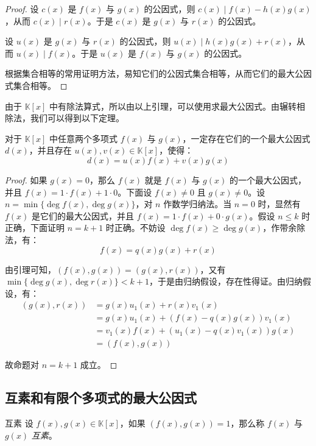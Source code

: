 \begin{proof}
	设 $c(x)$ 是 $f(x)$ 与 $g(x)$ 的公因式，则 $c(x) \mid f(x) - h(x) g(x)$，从而 $c(x) \mid r(x)$。于是 $c(x)$ 是 $g(x)$ 与 $r(x)$ 的公因式。

	设 $u(x)$ 是 $g(x)$ 与 $r(x)$ 的公因式，则 $u(x) \mid h(x) g(x) + r(x)$，从而 $u(x) \mid f(x)$。于是 $u(x)$ 是 $f(x)$ 与 $g(x)$ 的公因式。

	根据集合相等的常用证明方法，易知它们的公因式集合相等，从而它们的最大公因式集合相等。
\end{proof}

由于 $\mathbb K[x]$ 中有除法算式，所以由以上引理，可以使用\emph{}求最大公因式。由辗转相除法，我们可以得到以下定理。

\begin{proposition}
	对于 $\mathbb K[x]$ 中任意两个多项式 $f(x)$ 与 $g(x)$，一定存在它们的一个最大公因式 $d(x)$，并且存在 $u(x), v(x) \in \mathbb K[x]$，使得：
	$$
	d(x) = u(x) f(x) + v(x) g(x)
	$$
\end{proposition}

\begin{proof}
	如果 $g(x) = 0$，那么 $f(x)$ 就是 $f(x)$ 与 $g(x)$ 的一个最大公因式，并且 $f(x) = 1 \cdot f(x) + 1 \cdot 0$。下面设 $f(x) \ne 0$ 且 $g(x) \ne 0$。设 $n = \min \{ \deg f(x), \deg g(x) \}$，对 $n$ 作数学归纳法。当 $n = 0$ 时，显然有 $f(x)$ 是它们的最大公因式，并且 $f(x) = 1 \cdot f(x) + 0 \cdot g(x)$。假设 $n \le k$ 时正确，下面证明 $n = k + 1$ 时正确。不妨设 $\deg f(x) \ge \deg g(x)$，作带余除法，有：
	$$
	f(x) = q(x) g(x) + r(x)
	$$

	由引理可知，$(f(x), g(x)) = (g(x), r(x))$，又有 $\min\{\deg g(x), \deg r(x)\} < k + 1$，于是由归纳假设，存在性得证。由归纳假设，有：
	$$
	\begin{aligned}
		(g(x), r(x)) &= g(x) u_1(x) + r(x) v_1(x)
		\\&=
		g(x) u_1(x) + (f(x) - q(x) g(x)) v_1(x)
		\\&=
		v_1(x)f(x) + (u_1(x) - q(x) v_1(x)) g(x)
		\\&=
		(f(x), g(x))
	\end{aligned}
	$$

	故命题对 $n = k + 1$ 成立。
\end{proof}

\subsection{互素和有限个多项式的最大公因式}

\begin{definition}{互素}
	设 $f(x), g(x) \in \mathbb K[x]$，如果 $(f(x), g(x)) = 1$，那么称 $f(x)$ 与 $g(x)$ \emph{互素}。
\end{definition}

